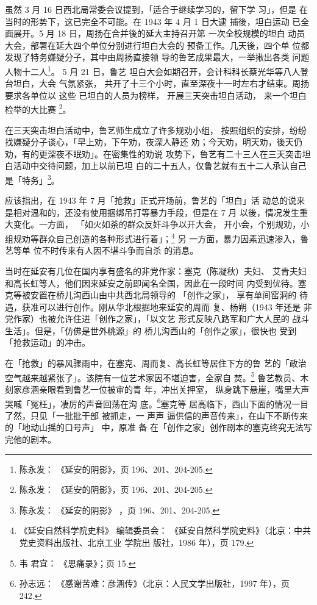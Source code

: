 虽然 3 月 16 日西北局常委会议提到，「适合于继续学习的，留下学 习」，但是
在当时的形势下，这已完全不可能。在 1943 年 4 月 1 日大逮 捕後，坦白运动
已全面展开。5 月 18 日，周扬在合并後的延大主持召开第 一次全校规模的坦白
动员大会，部署在延大四个单位分别进行坦白大会的 预备工作。几天後，四个单
位都发现了特务嫌疑分子，其中由周扬直接领 导的鲁艺成果最大，一举揪出各类
问题人物十二人\footnote{陈永发： 《延安的阴影》，页 196、201、204-205.}。
5 月 21 日，鲁艺 坦白大会如期召开，会计科科长蔡光华等八人登台坦白，大会
气氛紧张， 共开了十三个小时，直至深夜十一时左右才结束。周扬要求各单位以
这些 已坦白的人员为榜样， 开展三天突击坦白活动， 来一个坦白检举的大比赛
\footnote{陈永发： 《延安的阴影》，页 196、201、204-205.}。
 
在三天突击坦白活动中，鲁艺师生成立了许多规劝小组，
按照组织的安排，纷纷找嫌疑分子谈心，「早上劝，下午劝，夜深人静还
劝；今天劝，明天劝，後天仍劝，有的更深夜不眠劝」。在密集性的劝说
攻势下，鲁艺有二十三人在三天突击坦白活动中交待问题，加上以前已坦
白的二十五人，仅鲁艺就有五十二人承认自己是「特务」\footnote{陈永发：
《延安的阴影》
，页 196、201、204-205.}。

应该指出，在 1943 年 7 月「抢救」正式开场前，鲁艺的「坦白」活 动总的说来
是相对温和的，还没有使用捆绑吊打等暴力手段，但是在 7 月 以後，情况发生重
大变化。一方面， 「如火如荼的群众反奸斗争以开大会， 开小会，个别规劝，小
组规劝等群众自己创造的各种形式进行着」；\footnote{《延安自然科学院史料》
编辑委员会： 《延安自然科学院史料》（北京：中共党史资料出版社、北京工业
学院出 版社，1986 年），页 179.} 另 一方面，暴力因素迅速渗入，鲁艺等单
位不时传来有人因不堪斗争而自杀 的消息。

当时在延安有几位在国内享有盛名的非党作家：塞克（陈凝秋）夫妇、 艾青夫妇
和高长虹等人，他们因来延安之前即闻名全国，因此在一段时间 内受到优待。塞
克等被安置在桥儿沟西山由中共西北局领导的 「创作之家」， 享有单间窑洞的
待遇，获准可以进行创作。刚从华北根据地来延安的周而 复、杨朔（1943 年还是
非党作家）也被允许住进「创作之家」，「以文艺 形式反映八路军和广大人民的
战斗生活」。但是，「仿佛是世外桃源」的 桥儿沟西山的「创作之家」，很快也
受到「抢救运动」的冲击。

在「抢救」的暴风骤雨中，在塞克、周而复、高长虹等居住下方的鲁 艺的「政治
空气越来越紧张了」。该院有一位艺术家因不堪迫害，全家自 焚。\footnote{韦
君宜： 《思痛录》；页 15.} 鲁艺教员、木刻家彦涵亲眼看到鲁艺一位被审的青
年，冲出关押室， 纵身跳下悬崖，嘴里大声哭喊「冤枉」，凄厉的声音回荡在沟
底。\footnote{孙志远： 《感谢苦难：彦涵传》（北京：人民文学出版社，1997
年），页 242.}塞克等 居高临下，西山下面的情况一目了然，只见「一批批干部
被抓走，一 声声 逼供信的声音传来」，在山下不断传来的「地动山摇的口号声」
中，原准 备 在「创作之家」创作剧本的塞克终究无法写完他的剧本。
 
